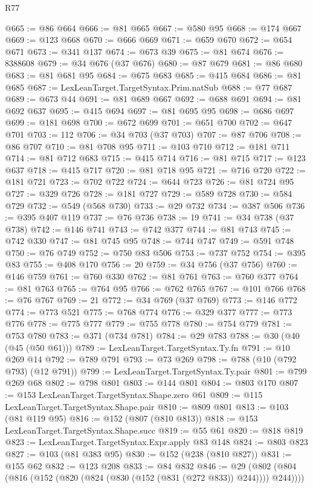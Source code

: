 \begin{lexlean}{R77}
\begin{coremodule}
@665 := @86 @664
@666 := @81 @665
@667 := @580 @95
@668 := @174 @667
@669 := @123 @668
@670 := @666 @669
@671 := @659 @670
@672 := @654 @671
@673 := @341 @137
@674 := @673 @39
@675 := @81 @674
@676 := 8388608
@679 := @34 @676 (@37 @676)
@680 := @87 @679
@681 := @86 @680
@683 := @81 @681 @95
@684 := @675 @683
@685 := @415 @684
@686 := @81 @685
@687 := LexLeanTarget.TargetSyntax.Prim.natSub
@688 := @77 @687
@689 := @673 @44
@691 := @81 @689 @667
@692 := @688 @691
@694 := @81 @692 @637
@695 := @415 @694
@697 := @81 @695 @95
@698 := @686 @697
@699 := @181 @698
@700 := @672 @699
@701 := @651 @700
@702 := @647 @701
@703 := 112
@706 := @34 @703 (@37 @703)
@707 := @87 @706
@708 := @86 @707
@710 := @81 @708 @95
@711 := @103 @710
@712 := @181 @711
@714 := @81 @712 @683
@715 := @415 @714
@716 := @81 @715
@717 := @123 @637
@718 := @415 @717
@720 := @81 @718 @95
@721 := @716 @720
@722 := @181 @721
@723 := @702 @722
@724 := @644 @723
@726 := @81 @724 @95
@727 := @329 @726
@728 := @181 @727
@729 := @589 @728
@730 := @584 @729
@732 := @549 (@568 @730)
@733 := @29 @732
@734 := @387 @506
@736 := @395 @407 @119
@737 := @76 @736
@738 := 19
@741 := @34 @738 (@37 @738)
@742 := @146 @741
@743 := @742 @377
@744 := @81 @743
@745 := @742 @330
@747 := @81 @745 @95
@748 := @744 @747
@749 := @591 @748
@750 := @76 @749
@752 := @750 @83 @506
@753 := @737 @752
@754 := @395 @83
@755 := @408 @170
@756 := 20
@759 := @34 @756 (@37 @756)
@760 := @146 @759
@761 := @760 @330
@762 := @81 @761
@763 := @760 @377
@764 := @81 @763
@765 := @764 @95
@766 := @762 @765
@767 := @101 @766
@768 := @76 @767
@769 := 21
@772 := @34 @769 (@37 @769)
@773 := @146 @772
@774 := @773 @521
@775 := @768 @774
@776 := @329 @377
@777 := @773 @776
@778 := @775 @777
@779 := @755 @778
@780 := @754 @779
@781 := @753 @780
@783 := @371 (@734 @781)
@784 := @29 @783
@788 := @30 (@40 (@45 (@50 @61)))
@789 := LexLeanTarget.TargetSyntax.Ty.fn
@791 := @10 @269 @14
@792 := @789 @791
@793 := @73 @269
@798 := @788 (@10 (@792 @793) (@12 @791))
@799 := LexLeanTarget.TargetSyntax.Ty.pair
@801 := @799 @269 @68
@802 := @798 @801
@803 := @144 @801
@804 := @803 @170
@807 := @153 LexLeanTarget.TargetSyntax.Shape.zero @61
@809 := @115 LexLeanTarget.TargetSyntax.Shape.pair
@810 := @809 @801
@813 := @103 (@81 @119 @95)
@816 := @152 (@807 (@810 @813))
@818 := @153 LexLeanTarget.TargetSyntax.Shape.succ
@819 := @55 @61
@820 := @818 @819
@823 := LexLeanTarget.TargetSyntax.Expr.apply @83 @148
@824 := @803 @823
@827 := @103 (@81 @383 @95)
@830 := @152 (@238 (@810 @827))
@831 := @155 @62
@832 := @123 @208
@833 := @84 @832
@846 := @29 (@802 (@804 (@816 (@152 (@820 (@824 (@830 (@152 (@831 (@272 @833)) @244)))) @244))))

\end{coremodule}
\end{lexlean}
